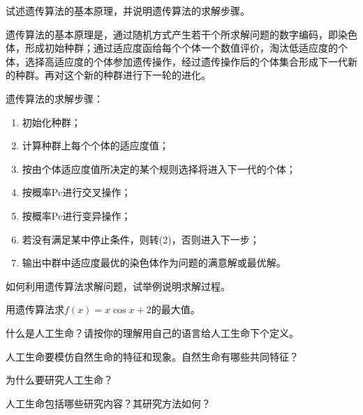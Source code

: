 \begin{question}
试述遗传算法的基本原理，并说明遗传算法的求解步骤。
\end{question}
\begin{solution}
遗传算法的基本原理是，通过随机方式产生若干个所求解问题的数字编码，即染色体，形成初始种群；通过适应度函给每个个体一个数值评价，淘汰低适应度的个体，选择高适应度的个体参加遗传操作，经过遗传操作后的个体集合形成下一代新的种群。再对这个新的种群进行下一轮的进化。\par
遗传算法的求解步骤：\par
	\begin{enumerate}
		\item 初始化种群；
		\item 计算种群上每个个体的适应度值；
		\item 按由个体适应度值所决定的某个规则选择将进入下一代的个体；
		\item 按概率Pc进行交叉操作；
		\item 按概率Pc进行变异操作；
		\item 若没有满足某中停止条件，则转(2)，否则进入下一步；
		\item 输出中群中适应度最优的染色体作为问题的满意解或最优解。
	\end{enumerate}
\end{solution}

\begin{question}
如何利用遗传算法求解问题，试举例说明求解过程。
\end{question}
\begin{solution}
\end{solution}

\begin{question}
用遗传算法求$f(x)=x\cos x + 2$的最大值。
\end{question}
\begin{solution}
\end{solution}

\begin{question}
什么是人工生命？请按你的理解用自己的语言给人工生命下个定义。
\end{question}
\begin{solution}
\end{solution}

\begin{question}
人工生命要模仿自然生命的特征和现象。自然生命有哪些共同特征？
\end{question}
\begin{solution}
\end{solution}

\begin{question}
为什么要研究人工生命？
\end{question}
\begin{solution}
\end{solution}

\begin{question}
人工生命包括哪些研究内容？其研究方法如何？
\end{question}
\begin{solution}
\end{solution}